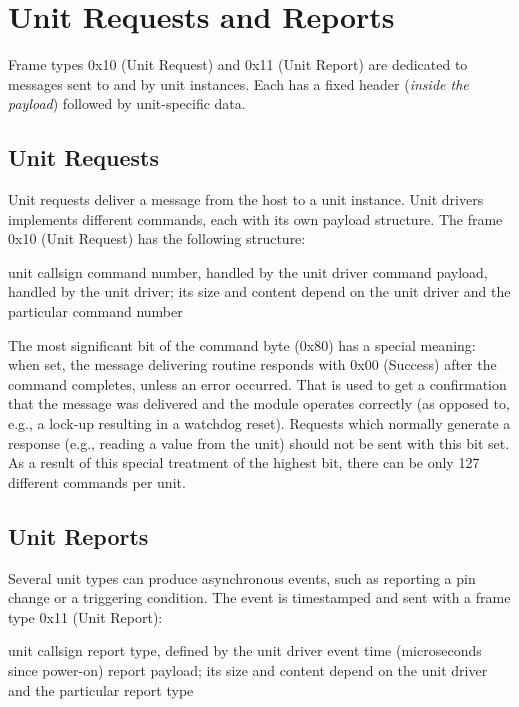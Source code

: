 \section{Unit Requests and Reports} \label{sec:unit_requests_reports}

Frame types 0x10 (Unit Request) and 0x11 (Unit Report) are dedicated to messages sent to and by unit instances. Each has a fixed header (\textit{inside the payload}) followed by unit-specific data.

\subsection{Unit Requests}

Unit requests deliver a message from the host to a unit instance. Unit drivers implements different commands, each with its own payload structure. The frame 0x10 (Unit Request) has the following structure:

\begin{boxedpayload}
	 unit callsign
	 command number, handled by the unit driver
	 command payload, handled by the unit driver; its size and content depend on the unit driver and the particular command number
\end{boxedpayload}

The most significant bit of the command byte (0x80) has a special meaning: when set, the message delivering routine responds with 0x00 (Success) after the command completes, unless an error occurred. That is used to get a confirmation that the message was delivered and the module operates correctly (as opposed to, e.g., a lock-up resulting in a watchdog reset). Requests which normally generate a response (e.g., reading a value from the unit) should not be sent with this bit set. As a result of this special treatment of the highest bit, there can be only 127 different commands per unit.

\subsection{Unit Reports}

Several unit types can produce asynchronous events, such as reporting a pin change or a triggering condition. The event is timestamped and sent with a frame type 0x11 (Unit Report):

\begin{boxedpayload}
	 unit callsign
	 report type, defined by the unit driver
	 event time (microseconds since power-on)
	 report payload; its size and content depend on the unit driver and the particular report type
\end{boxedpayload}

















